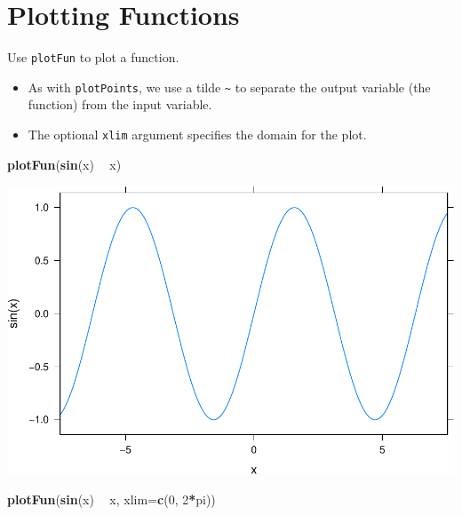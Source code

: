 \documentclass[
]{book}
\newenvironment{Shaded}{\begin{snugshade}}{\end{snugshade}}
\newcommand{\DataTypeTok}[1]{\textcolor[rgb]{0.13,0.29,0.53}{#1}}
\newcommand{\DecValTok}[1]{\textcolor[rgb]{0.00,0.00,0.81}{#1}}
\newcommand{\KeywordTok}[1]{\textcolor[rgb]{0.13,0.29,0.53}{\textbf{#1}}}
\newcommand{\NormalTok}[1]{#1}
\newcommand{\OperatorTok}[1]{\textcolor[rgb]{0.81,0.36,0.00}{\textbf{#1}}}
\newcommand{\StringTok}[1]{\textcolor[rgb]{0.31,0.60,0.02}{#1}}
\providecommand{\tightlist}{%
  \setlength{\itemsep}{0pt}\setlength{\parskip}{0pt}}
\begin{document}
\hypertarget{plotting-functions}{%
\section{Plotting Functions}\label{plotting-functions}}

Use \texttt{plotFun} to plot a function.

\begin{itemize}
\tightlist
\item
  As with \texttt{plotPoints}, we use a tilde \texttt{\textasciitilde{}} to separate the output variable (the function) from the input variable.
\item
  The optional \texttt{xlim} argument specifies the domain for the plot.
\end{itemize}

\begin{Shaded}
\begin{Highlighting}[]
\KeywordTok{plotFun}\NormalTok{(}\KeywordTok{sin}\NormalTok{(x) }\OperatorTok{~}\StringTok{ }\NormalTok{x)}
\end{Highlighting}
\end{Shaded}

\includegraphics{_bookdown_files/math135_handbook_files/figure-latex/unnamed-chunk-30-1.pdf}

\begin{Shaded}
\begin{Highlighting}[]
\KeywordTok{plotFun}\NormalTok{(}\KeywordTok{sin}\NormalTok{(x) }\OperatorTok{~}\StringTok{ }\NormalTok{x, }\DataTypeTok{xlim=}\KeywordTok{c}\NormalTok{(}\DecValTok{0}\NormalTok{, }\DecValTok{2}\OperatorTok{*}\NormalTok{pi))}
\end{Highlighting}
\end{Shaded}
\end{document}

